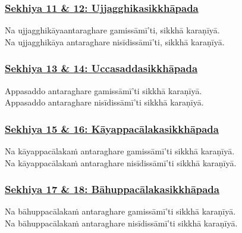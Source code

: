 \subsubsection*{\hyperref[training11-12]{Sekhiya 11 \& 12: Ujjagghikasikkhāpada}}
\label{sekh11-12}

Na ujjagghikāya\makeatletter\hyperlink{endnote475-appendix}\makeatother \thinspace antaraghare gamissāmī'ti, sikkhā karaṇīyā.\\
Na ujjagghikāya antaraghare nisīdissāmī'ti, sikkhā karaṇīyā.



\subsubsection*{\hyperref[training13-14]{Sekhiya 13 \& 14: Uccasaddasikkhāpada}}
\label{sekh13-14}

Appasaddo antaraghare gamissāmī'ti sikkhā karaṇīyā.\\
Appasaddo antaraghare nisīdissāmī'ti sikkhā karaṇīyā.



\subsubsection*{\hyperref[training15-16]{Sekhiya 15 \& 16: Kāyappacālakasikkhāpada}}
\label{sekh15-16}

Na kāyappacālakaṁ antaraghare gamissāmī'ti sikkhā karaṇīyā.\\
Na kāyappacālakaṁ antaraghare nisīdissāmī'ti sikkhā karaṇīyā.



\subsubsection*{\hyperref[training17-18]{Sekhiya 17 \& 18: Bāhuppacālakasikkhāpada}}
\label{sekh17-18}

Na bāhuppacālakaṁ antaraghare gamissāmī'ti sikkhā karaṇīyā.\\
Na bāhuppacālakaṁ antaraghare nisīdissāmī'ti sikkhā karaṇīyā.



